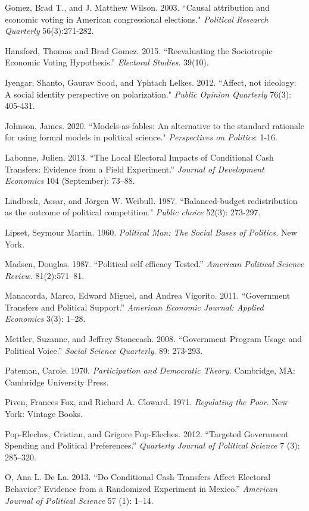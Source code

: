 \documentclass[12pt]{paper}
\begin{document}
\begin{hangparas}{.25in}{1}
Gomez, Brad T., and J. Matthew Wilson. 2003. ``Causal attribution and economic voting in American congressional elections." \textit{Political Research Quarterly} 56(3):271-282.

Hansford, Thomas and Brad Gomez. 2015. ``Reevaluating the Sociotropic Economic Voting Hypothesis.” \textit{Electoral Studies}. 39(10).

Iyengar, Shanto, Gaurav Sood, and Yphtach Lelkes. 2012. ``Affect, not ideology: A social identity perspective on polarization." \textit{Public Opinion Quarterly} 76(3): 405-431.

Johnson, James. 2020. ``Models-as-fables: An alternative to the standard rationale for using formal models in political science." \textit{Perspectives on Politics}: 1-16.

Labonne, Julien. 2013. ``The Local Electoral Impacts of Conditional Cash Transfers: Evidence from a Field Experiment.” \textit{Journal of Development Economics} 104 (September): 73–88.

Lindbeck, Assar, and Jörgen W. Weibull. 1987. ``Balanced-budget redistribution as the outcome of political competition." \textit{Public choice} 52(3): 273-297.

Lipset, Seymour Martin. 1960. \textit{Political Man: The Social Bases of Politics.} New York. 

Madsen, Douglas. 1987. ``Political self efficacy Tested.” \textit{American Political Science Review.} 81(2):571–81.

Manacorda, Marco, Edward Miguel, and Andrea Vigorito. 2011. ``Government Transfers and Political Support.” \textit{American Economic Journal: Applied Economics} 3(3): 1–28.

Mettler, Suzanne, and Jeffrey Stonecash. 2008. ``Government Program Usage and Political Voice.” \textit{Social Science Quarterly}. 89: 273-293. 


Pateman, Carole. 1970. \textit{Participation and Democratic Theory. }Cambridge, MA: Cambridge University Press.


Piven, Frances Fox, and Richard A. Cloward. 1971. \textit{Regulating the Poor.} New York: Vintage Books.


Pop-Eleches, Cristian, and Grigore Pop-Eleches. 2012. ``Targeted Government Spending and Political Preferences.” \textit{Quarterly Journal of Political Science} 7 (3): 285–320.


O, Ana L. De La. 2013. ``Do Conditional Cash Transfers Affect Electoral Behavior? Evidence from a Randomized Experiment in Mexico.” \textit{American Journal of Political Science} 57 (1): 1–14.



\end{hangparas}
\end{document}
